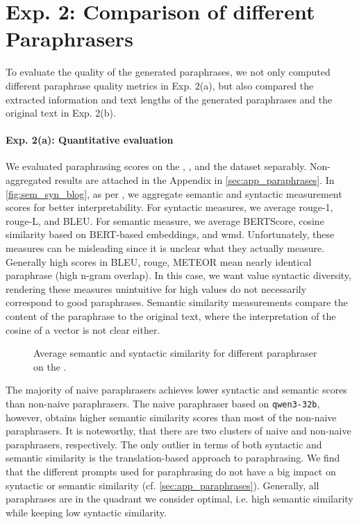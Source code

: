 \section{Exp. 2: Comparison of different Paraphrasers}

To evaluate the quality of the generated paraphrases, we not only computed different paraphrase quality metrics in Exp. 2(a), but also compared the extracted information and text lengths of the generated paraphrases and the original text in Exp. 2(b).

\paragraph{Exp. 2(a): Quantitative evaluation}

We evaluated paraphrasing scores on the \dataBlog{}, \dataGutenberg{}, and the \dataStudent{} dataset separably.
Non-aggregated results are attached in the Appendix in \autoref{sec:app_paraphrases}.
In \autoref{fig:sem_syn_blog}, as per \citet{gohsen_captions_2023}, we aggregate semantic and syntactic measurement scores for better interpretability.
For syntactic measures, we average \ac{rouge}-1, \ac{rouge}-L, and BLEU.
For semantic measure, we average BERTScore, cosine similarity based on BERT-based embeddings, and \ac{wmd}.
Unfortunately, these measures can be misleading since it is unclear what they actually measure.
Generally high scores in BLEU, \ac{rouge}, METEOR mean nearly identical paraphrase (high n-gram overlap).
In this case, we want value syntactic diversity, rendering these measures unintuitive 
for high values do not necessarily correspond to good paraphrases.
Semantic similarity measurements compare the content of the paraphrase to the original text, 
where the interpretation of the cosine of a vector is not clear either.

\begin{figure}[htbp]
    \centering
    
    \caption{Average semantic and syntactic similarity for different paraphraser on the \dataBlog{}.}
    \label{fig:sem_syn_blog}
\end{figure}


The majority of naive paraphrasers achieves lower syntactic and semantic scores than non-naive paraphrasers.
The naive paraphraser based on \texttt{qwen3-32b}, however, obtains higher semantic similarity scores than most of the non-naive paraphrasers.
It is noteworthy, that there are two clusters of naive and non-naive paraphrasers, respectively.
The only outlier in terms of both syntactic and semantic similarity is the translation-based approach to paraphrasing.
We find that the different prompts used for paraphrasing do not have a big impact on syntactic or semantic similarity (cf. \autoref{sec:app_paraphrases}).
Generally, all paraphrases are in the quadrant we consider optimal, i.e. high semantic similarity while keeping low syntactic similarity.


